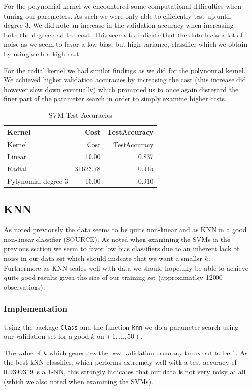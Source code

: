 \documentclass[
]{article}
\begin{document}
For the polynomial kernel we encountered some computational difficulties
when tuning our paremeters. As such we were only able to efficiently
test up until degree 3. We did note an increase in the validation
accuracy when increasing both the degree and the cost. This seems to
indicate that the data lacks a lot of noise as we seem to favor a low
bias, but high variance, classifier which we obtain by using such a high
cost.

For the radial kernel we had similar findings as we did for the
polynomial kernel. We achieved higher validation accuracies by
increasing the cost (this increase did however slow down eventually)
which prompted us to once again disregard the finer part of the
parameter search in order to simply examine higher costs.

\begin{longtable}[]{@{}lrr@{}}
\caption{SVM Test Accuracies}\tabularnewline
\toprule
Kernel & Cost & TestAccuracy\tabularnewline
\midrule
\endfirsthead
\toprule
Kernel & Cost & TestAccuracy\tabularnewline
\midrule
\endhead
Linear & 10.00 & 0.837\tabularnewline
Radial & 31622.78 & 0.915\tabularnewline
Pylynomial degree 3 & 10.00 & 0.910\tabularnewline
\bottomrule
\end{longtable}

\hypertarget{knn}{%
\subsection{KNN}\label{knn}}

As noted previously the data seems to be quite non-linear and as KNN in
a good non-linear classifier (SOURCE). As noted when examining the SVMs
in the previous section we seem to favor low bias classifiers due to an
inherent lack of noise in our data set which should inidcate that we
want a smaller \(k\). Furthermore as KNN scales well with data we should
hopefully be able to achieve quite good results given the size of our
training set (approximatley 12000 observations).

\hypertarget{implementation-1}{%
\subsubsection{Implementation}\label{implementation-1}}

Using the package \texttt{Class} and the function \texttt{knn} we do a
parameter search using our validation set for a good \(k\) on
\((1,...,50)\).

The value of \(k\) which generates the best validation accuracy turns
out to be 1. As the best kNN classifier, which performs extremely well
with a test accuracy of 0.9399319 is a 1-NN, this strongly indicates
that our data is not very noisy at all (which we also noted when
examining the SVMs).
\end{document}
